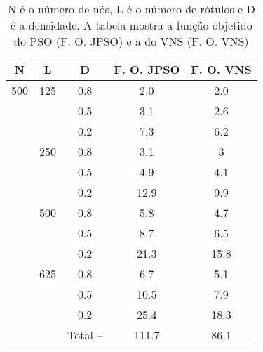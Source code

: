 \documentclass{sig-alternate-05-2015}
\begin{document}
\begin{table}
        \begin{tabular}{ccccc}
                \hline \rule[-2ex]{0pt}{5.5ex} N & L & D  & F. O. JPSO & F. O. VNS \\ 
                \hline \rule[-2ex]{0pt}{5.5ex} 500 & 125 & 0.8 & 2.0 & 2.0\\ 
                \hline \rule[-2ex]{0pt}{5.5ex}  &  & 0.5 & 3.1 & 2.6\\ 
                \hline \rule[-2ex]{0pt}{5.5ex}  &  & 0.2 & 7.3 & 6.2\\ 
                \hline \rule[-2ex]{0pt}{5.5ex}  & 250 & 0.8 & 3.1 & 3 \\ 
                \hline \rule[-2ex]{0pt}{5.5ex}  &  & 0.5 & 4.9 & 4.1\\ 
                \hline \rule[-2ex]{0pt}{5.5ex}  &  & 0.2 & 12.9 & 9.9\\ 
                \hline \rule[-2ex]{0pt}{5.5ex}  & 500 & 0.8 & 5.8 & 4.7\\ 
                \hline \rule[-2ex]{0pt}{5.5ex}  &  & 0.5 & 8.7 &  6.5\\ 
                \hline \rule[-2ex]{0pt}{5.5ex}  &  & 0.2 & 21.3 &  15.8\\ 
                \hline \rule[-2ex]{0pt}{5.5ex}  & 625 & 0.8 & 6.7 & 5.1\\ 
                \hline \rule[-2ex]{0pt}{5.5ex}  &  & 0.5 & 10.5 & 7.9\\ 
                \hline \rule[-2ex]{0pt}{5.5ex}  &  & 0.2 & 25.4 &  18.3\\ 
                \hline \rule[-2ex]{0pt}{5.5ex}  &  & Total -- & 111.7 &  86.1\\ 
                \hline 
        \end{tabular}  
        \caption{N é o número de nós, L é o número de rótulos e D é a densidade.  A tabela mostra a função objetido do PSO (F. O. JPSO) e a do VNS (F. O. VNS)}
        \label{tab7}
\end{table}
\end{document}
